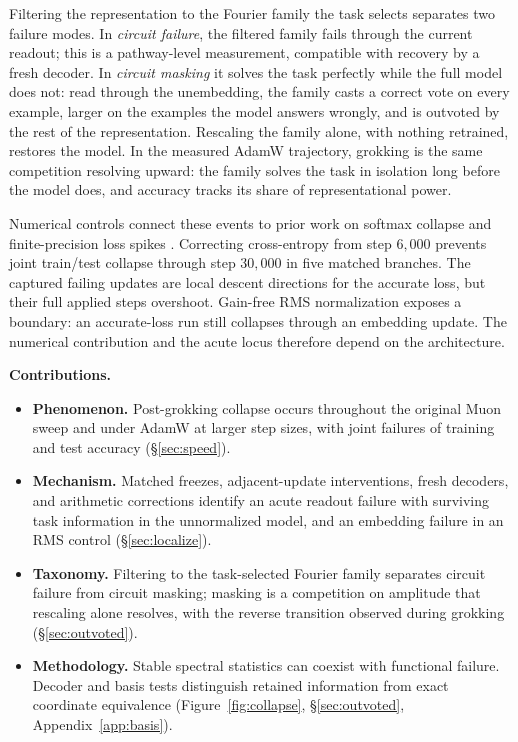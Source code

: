 \documentclass{article}
\begin{document}
Filtering the representation to the Fourier family the task selects separates two failure modes. In \emph{circuit failure}, the filtered family fails through the current readout; this is a pathway-level measurement, compatible with recovery by a fresh decoder. In \emph{circuit masking} it solves the task perfectly while the full model does not: read through the unembedding, the family casts a correct vote on every example, larger on the examples the model answers wrongly, and is outvoted by the rest of the representation. Rescaling the family alone, with nothing retrained, restores the model. In the measured AdamW trajectory, grokking is the same competition resolving upward: the family solves the task in isolation long before the model does, and accuracy tracks its share of representational power.

Numerical controls connect these events to prior work on softmax collapse and finite-precision loss spikes \citep{prieto2025grokking,liu2026glitching}. Correcting cross-entropy from step $6{,}000$ prevents joint train/test collapse through step $30{,}000$ in five matched branches. The captured failing updates are local descent directions for the accurate loss, but their full applied steps overshoot. Gain-free RMS normalization exposes a boundary: an accurate-loss run still collapses through an embedding update. The numerical contribution and the acute locus therefore depend on the architecture.

\textbf{Contributions.}
\begin{itemize}\itemsep0pt
\item \textbf{Phenomenon.} Post-grokking collapse occurs throughout the original Muon sweep and under AdamW at larger step sizes, with joint failures of training and test accuracy (\S\ref{sec:speed}).
\item \textbf{Mechanism.} Matched freezes, adjacent-update interventions, fresh decoders, and arithmetic corrections identify an acute readout failure with surviving task information in the unnormalized model, and an embedding failure in an RMS control (\S\ref{sec:localize}).
\item \textbf{Taxonomy.} Filtering to the task-selected Fourier family separates circuit failure from circuit masking; masking is a competition on amplitude that rescaling alone resolves, with the reverse transition observed during grokking (\S\ref{sec:outvoted}).
\item \textbf{Methodology.} Stable spectral statistics can coexist with functional failure. Decoder and basis tests distinguish retained information from exact coordinate equivalence (Figure~\ref{fig:collapse}, \S\ref{sec:outvoted}, Appendix~\ref{app:basis}).
\end{itemize}
\end{document}
